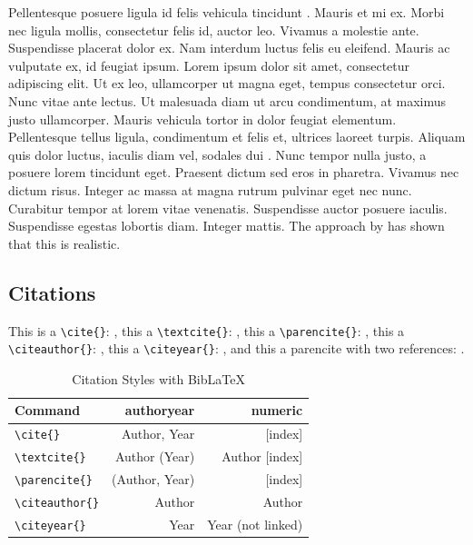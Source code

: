 Pellentesque posuere ligula id felis vehicula tincidunt \parencite{giampietroEstimatingStochasticDiscount2018}. Mauris et mi ex. Morbi nec ligula mollis, consectetur felis id, auctor leo. Vivamus a molestie ante. Suspendisse placerat dolor ex. Nam interdum luctus felis eu eleifend. Mauris ac vulputate ex, id feugiat ipsum. Lorem ipsum dolor sit amet, consectetur adipiscing elit. Ut ex leo, ullamcorper ut magna eget, tempus consectetur orci. Nunc vitae ante lectus. Ut malesuada diam ut arcu condimentum, at maximus justo ullamcorper. Mauris vehicula tortor in dolor feugiat elementum. Pellentesque tellus ligula, condimentum et felis et, ultrices laoreet turpis. Aliquam quis dolor luctus, iaculis diam vel, sodales dui \parencite{guidolin_forecasting_2021}.
Nunc tempor nulla justo, a posuere lorem tincidunt eget. Praesent dictum sed eros in pharetra. Vivamus nec dictum risus. Integer ac massa at magna rutrum pulvinar eget nec nunc. Curabitur tempor at lorem vitae venenatis. Suspendisse auctor posuere iaculis. Suspendisse egestas lobortis diam. Integer mattis. The approach by \textcite{guidolin_forecasting_2021} has shown that this is realistic. 

\subsection{Citations}
This is a \verb|\cite{}|: \cite{guidolin_forecasting_2021}, this a \verb|\textcite{}|: \textcite{guidolin_forecasting_2021}, this a \verb|\parencite{}|: \parencite{guidolin_forecasting_2021}, this a \verb|\citeauthor{}|: \citeauthor{guidolin_forecasting_2021}, this a \verb|\citeyear{}|: \citeyear{guidolin_forecasting_2021}, and this a parencite with two references: \parencite{giampietroEstimatingStochasticDiscount2018, guidolin_forecasting_2021}.

\vspace{-10pt}
\begin{table}[h!]
\caption{Citation Styles with BibLaTeX}
\footnotesize
\begin{tabular*}{\textwidth}{@{\extracolsep{\fill}}lrr}
\toprule
\textbf{Command} & \textbf{authoryear} & \textbf{numeric} \\
\midrule
\verb|\cite{}|  & Author, Year & [index] \\
\verb|\textcite{}|  & Author (Year) & Author [index] \\
\verb|\parencite{}|  & (Author, Year)  & [index]\\
\verb|\citeauthor{}|  & Author & Author\\
\verb|\citeyear{}|  & Year & Year (not linked)\\
\bottomrule
\end{tabular*}
\label{tab:citation styles}
\end{table}


